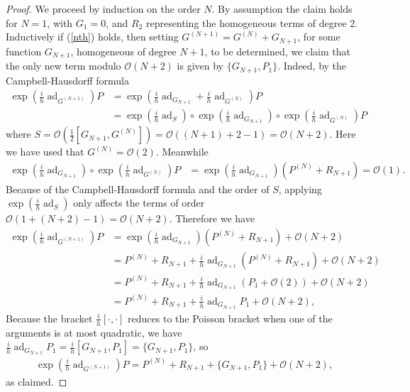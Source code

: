 \documentclass[12pt,lettersize]{article}
\newcommand{\poiss}[1]{\{#1\}}
\theoremstyle{plain}%
\numberwithin{theorem}{section}
\numberwithin{equation}{section}
\theoremstyle{definition}
\theoremstyle{remark}
\DeclareMathOperator{\aad}{ad}
\begin{document}
{\begin{proof}
We proceed by induction on the order $N$. By assumption the claim holds for $N = 1$, with $G_1 = 0$, and $R_2$ representing the homogeneous terms of degree 2. 
Inductively if (\ref{nth}) holds, then setting $G^{(N+1)} = G^{(N)} + G_{N+1}$, for some function $G_{N+1}$, homogeneous of degree $N+1$, to be determined, we claim that the only new term modulo $\mathcal{O}(N+2)$ is given by $\poiss{G_{N+1},P_1}$. Indeed, by the Campbell-Hausdorff formula
%
\begin{align*}{}
\textstyle \exp\left( \frac{i}{h}\aad_{G^{(N+1)}}\right)P
&=\textstyle   \exp\left( \frac{i}{h}\aad_{G_{N+1}} + \frac{i}{h} \aad_{G^{(N)}}\right) P \\
&=\textstyle  \exp\left( \frac{i}{h}\aad_S\right)\circ\exp\left( \frac{i}{h}\aad_{G_{N+1}}\right) \circ \exp\left( \frac{i}{h}\aad_{G^{(N)}}\right) P
\end{align*}
%
where $S = \mathcal{O}(\frac{1}{2} [G_{N+1},G^{(N)}]) = \mathcal{O}((N+1)+2-1) = \mathcal{O}(N+2)$. Here we have used that $G^{(N)}= \mathcal{O}(2)$.  Meanwhile 
%
\begin{align*}{}
\textstyle \exp\left( \frac{i}{h}\aad_{G_{N+1}}\right) \circ \exp\left( \frac{i}{h}\aad_{G^{(N)}}\right) P
&= \textstyle  \exp\left( \frac{i}{h}\aad_{G_{N+1}}\right)(P^{(N)} + R_{N+1}) = \mathcal{O}(1).
\end{align*}
%
Because of the Campbell-Hausdorff formula and the order of $S$, applying $\exp(\frac{i}{h}\aad_S)$ only affects the terms of order $\mathcal{O}(1+(N+2)-1) =  \mathcal{O}(N+2)$. Therefore we have
%
\begin{align*}{}
\textstyle \exp\left( \frac{i}{h}\aad_{G^{(N+1)}}\right)P
&= \textstyle \exp\left( \frac{i}{h}\aad_{G_{N+1}}\right)(P^{(N)} + R_{N+1}) + \mathcal{O}(N+2)\\
&= \textstyle P^{(N)} + R_{N+1} + \frac{i}{h}\aad_{G_{N+1}} (P^{(N)} + R_{N+1}) + \mathcal{O}(N+2) \\
&= \textstyle P^{(N)} + R_{N+1} + \frac{i}{h}\aad_{G_{N+1}} (P_1+\mathcal{O}(2)) + \mathcal{O}(N+2) \\
&= \textstyle P^{(N)} + R_{N+1} + \frac{i}{h}\aad_{G_{N+1}} P_1 + \mathcal{O}(N+2),
\end{align*}
%
Because the bracket $\frac{i}{h}[\cdot,\cdot]$ reduces to the Poisson bracket when one of the arguments is at most quadratic, we have $\frac{i}{h}\aad_{G_{N+1}}P_1 = \frac{i}{h}[G_{N+1},P_1] = \poiss{G_{N+1},P_1}$, so 
%
\begin{align*}{}
\textstyle \exp\left( \frac{i}{h}\aad_{G^{(N+1)}}\right)P = P^{(N)} + R_{N+1} + \poiss{G_{N+1},P_1} + \mathcal{O}(N+2),
\end{align*}
%
as claimed.


\end{proof}}
\end{document}
